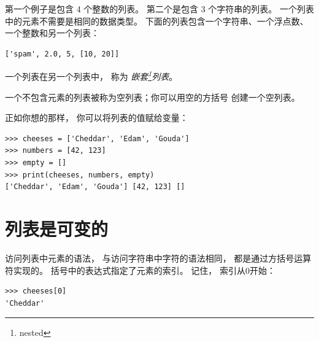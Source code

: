 第一个例子是包含 4 个整数的列表。
第二个是包含 3 个字符串的列表。
一个列表中的元素不需要是相同的数据类型。
下面的列表包含一个字符串、一个浮点数、一个整数和另一个列表：

\begin{lstlisting}
['spam', 2.0, 5, [10, 20]]
\end{lstlisting}

%

一个列表在另一个列表中， 称为 {\em 嵌套\footnote{nested}列表}。
  


一个不包含元素的列表被称为空列表；你可以用空的方括号 \li{[]} 创建一个空列表。

  


正如你想的那样， 你可以将列表的值赋给变量：

\begin{lstlisting}
>>> cheeses = ['Cheddar', 'Edam', 'Gouda']
>>> numbers = [42, 123]
>>> empty = []
>>> print(cheeses, numbers, empty)
['Cheddar', 'Edam', 'Gouda'] [42, 123] []
\end{lstlisting}
%

\section{列表是可变的}
\label{mutable}
  
  


访问列表中元素的语法， 与访问字符串中字符的语法相同， 都是通过方括号运算符实现的。
括号中的表达式指定了元素的索引。
记住， 索引从0开始：

\begin{lstlisting}
>>> cheeses[0]
'Cheddar'
\end{lstlisting}

